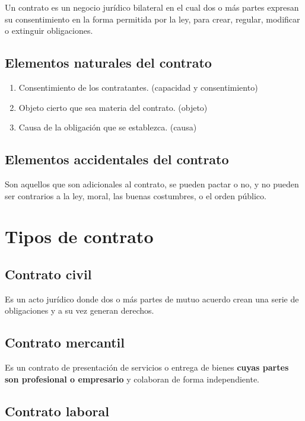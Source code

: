 \documentclass{article}
\begin{document}
	Un contrato es un negocio jurídico bilateral en el cual dos o más partes expresan su consentimiento en la forma permitida por la ley, para crear, regular, modificar o extinguir obligaciones.
	
	\subsection*{Elementos naturales del contrato}
	
	\begin{enumerate}
		\item Consentimiento de los contratantes. (capacidad y consentimiento)
		\item Objeto cierto que sea materia del contrato. (objeto)
		\item Causa de la obligación que se establezca. (causa)
	\end{enumerate}
	
	\subsection*{Elementos accidentales del contrato}
	
	Son aquellos que son adicionales al contrato, se pueden pactar o no, y no pueden ser contrarios a la ley, moral, las buenas costumbres, o el orden público.
	
	\section*{Tipos de contrato}
	
	\subsection*{Contrato civil}
	
	Es un acto jurídico donde dos o más partes de mutuo acuerdo crean una serie de obligaciones y a su vez generan derechos.
	
	\subsection*{Contrato mercantil}
	
	Es un contrato de presentación de servicios o entrega de bienes \textbf{cuyas partes son profesional o empresario} y colaboran de forma independiente.
	
	\subsection*{Contrato laboral}
	
\end{document}
